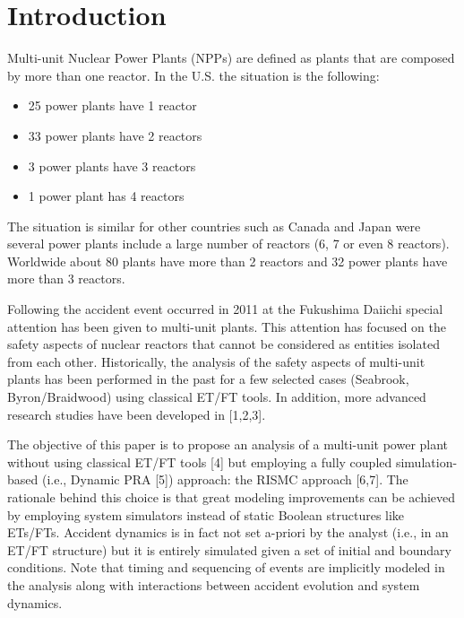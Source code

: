 \section{Introduction}
\label{sec:introduction}

Multi-unit Nuclear Power Plants (NPPs) are defined as plants that are composed by more than one reactor. 
In the U.S. the situation is the following:
\begin{itemize}
  \item 25 power plants have 1 reactor
  \item 33 power plants have 2 reactors
  \item 3 power plants have 3 reactors
  \item 1 power plant has 4 reactors
\end{itemize}
The situation is similar for other countries such as Canada and Japan were 
several power plants include a large number of reactors (6, 7 or even 8 reactors). 
Worldwide about 80 plants have more than 2 reactors and 32 power plants have more than 3 reactors. 

Following the accident event occurred in 2011 at the Fukushima Daiichi special 
attention has been given to multi-unit plants. This attention has focused on the 
safety aspects of nuclear reactors that cannot be considered as entities isolated from each other. 
Historically, the analysis of the safety aspects of multi-unit plants has been performed 
in the past for a few selected cases (Seabrook, Byron/Braidwood) using classical ET/FT tools. 
In addition, more advanced research studies have been developed in [1,2,3]. 

The objective of this paper is to propose an analysis of a multi-unit power plant without 
using classical ET/FT tools [4] but employing a fully coupled simulation-based 
(i.e., Dynamic PRA [5]) approach: the RISMC approach [6,7]. The rationale behind this choice 
is that great modeling improvements can be achieved by employing system simulators instead 
of static Boolean structures like ETs/FTs. 
Accident dynamics is in fact not set a-priori by the analyst (i.e., in an ET/FT structure) 
but it is entirely simulated given a set of initial and boundary conditions. Note that timing and 
sequencing of events are implicitly modeled in the analysis along with interactions between 
accident evolution and system dynamics.
